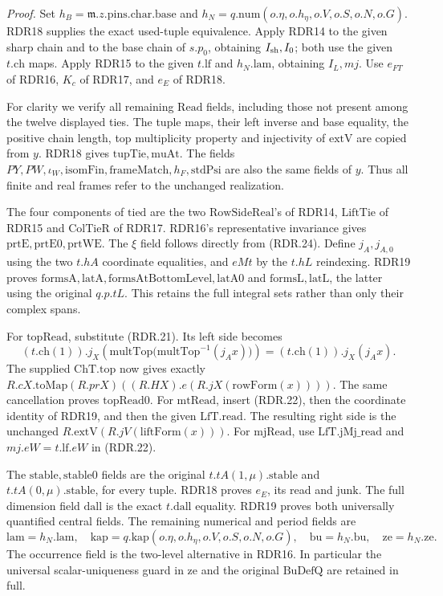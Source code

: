 \emph{Proof.}
Set \(h_B=\mathfrak m.z.\mathrm{pins.char.base}\) and
\(h_N=q.\mathrm{num}(o.\eta,o.h_\eta,o.V,o.S,o.N,o.G)\).
RDR18 supplies the exact used-tuple equivalence.  Apply
RDR14 to the given sharp chain and to the base chain of
\(s.p_0\), obtaining \(I_{\rm sh},I_0\); both use the
given \(t.\mathrm{ch}\) maps.  Apply RDR15 to the given
\(t.\mathrm{lf}\) and \(h_N.\mathrm{lam}\), obtaining
\(I_L,mj\).  Use \(e_{FT}\) of RDR16, \(K_c\) of RDR17,
and \(e_E\) of RDR18.

For clarity we verify all remaining \(\mathrm{Read}\) fields,
including those not present among the twelve displayed ties.
The tuple maps, their left inverse and base equality, the
positive chain length, top multiplicity property and
injectivity of \(\mathrm{extV}\) are copied from \(y\).
RDR18 gives \(\mathrm{tupTie,muAt}\).  The fields
\(PY,PW,\iota_W,\mathrm{isomFin,frameMatch},h_F,\mathrm{stdPsi}\)
are also the same fields of \(y\).  Thus all finite and real
frames refer to the unchanged realization.

The four components of \(\mathrm{tied}\) are the two
\(\mathrm{RowSideReal}\)'s of RDR14, \(\mathrm{LiftTie}\)
of RDR15 and \(\mathrm{ColTieR}\) of RDR17.  RDR16's
representative invariance gives \(\mathrm{prtE,prtE0,prtWE}\).
The \(\xi\) field follows directly from (RDR.24).
Define \(j_A,j_{A,0}\) using the two \(t.hA\) coordinate
equalities, and \(eMt\) by the \(t.hL\) reindexing.
RDR19 proves \(\mathrm{formsA,latA,formsAtBottomLevel,latA0}\)
and \(\mathrm{formsL,latL}\), the latter using the original
\(q.p.tL\).  This retains the full integral sets rather
than only their complex spans.

For \(\mathrm{topRead}\), substitute (RDR.21).  Its left
side becomes
\[
 (t.\mathrm{ch}(1)).j_X\!\left(
   \mathrm{multTop}\bigl(\mathrm{multTop}^{-1}(j_Ax)\bigr)\right)
           =(t.\mathrm{ch}(1)).j_X(j_Ax).                   \tag{RDR.29}
\]
The supplied \(\mathrm{ChT.top}\) now gives exactly
\(R.cX.\mathrm{toMap}(R.prX)((R.HX).e(R.jX(\mathrm{rowForm}(x))))\).
The same cancellation proves \(\mathrm{topRead0}\).
For \(\mathrm{mtRead}\), insert (RDR.22), then the coordinate
identity of RDR19, and then the given \(\mathrm{LfT.read}\).
The resulting right side is the unchanged
\(R.\mathrm{extV}(R.jV(\mathrm{liftForm}(x)))\).
For \(\mathrm{mjRead}\), use \(\mathrm{LfT.jMj\_read}\)
and \(mj.eW=t.\mathrm{lf}.eW\) in (RDR.22).

The \(\mathrm{stable,stable0}\) fields are the original
\(t.tA(1,\mu).\mathrm{stable}\) and
\(t.tA(0,\mu).\mathrm{stable}\), for every tuple.
RDR18 proves \(e_E\), its read and \(\mathrm{junk}\).
The full dimension field \(\mathrm{dall}\) is the exact
\(t.\mathrm{dall}\) equality.  RDR19 proves both universally
quantified central fields.  The remaining numerical and
period fields are
\[
 \mathrm{lam}=h_N.\mathrm{lam},\quad
 \mathrm{kap}=q.\mathrm{kap}(o.\eta,o.h_\eta,o.V,o.S,o.N,o.G),
 \quad \mathrm{bu}=h_N.\mathrm{bu},\quad
 \mathrm{ze}=h_N.\mathrm{ze}.                               \tag{RDR.30}
\]
The occurrence field is the two-level alternative in RDR16.
In particular the universal scalar-uniqueness guard in
\(\mathrm{ze}\) and the original \(\mathrm{BuDefQ}\) are
retained in full.

